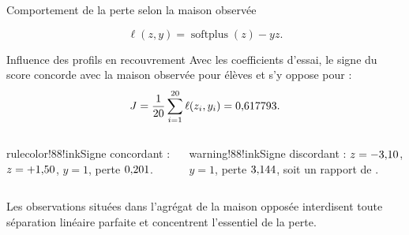 \begin{frame}[t]{Comportement de la perte selon la maison observée}
  \centering
  \[
    \ell(z,y)=\operatorname{softplus}(z)-yz.
  \]
\end{frame}

\begin{frame}[t]{Influence des profils en recouvrement}
  Avec les coefficients d'essai, le signe du score concorde avec la maison
  observée pour \MicroTrialAgree{} élèves et s'y oppose pour
  \MicroTrialDisagree{} :
  \[
    J=\frac1{20}\sum_{i=1}^{20}\ell(z_i,y_i)
      =0{,}617793.
  \]
  \vspace{3mm}
  \begin{columns}[T,onlytextwidth]
      \begin{coursecallout}{rulecolor!88!ink}{Signe concordant}
        \MicroTrialBestName{} : \(z=+1{,}50\), \(y=1\), perte
        \(0{,}201\).
      \end{coursecallout}
      \begin{coursecallout}{warning!88!ink}{Signe discordant}
        \MicroTrialWorstName{} : \(z=-3{,}10\), \(y=1\), perte
        \(3{,}144\), soit un rapport de \MicroTrialLossRatio.
      \end{coursecallout}
  \end{columns}
  \vfill
  Les observations situées dans l'agrégat de la maison opposée interdisent
  toute séparation linéaire parfaite et concentrent l'essentiel de la perte.
\end{frame}



